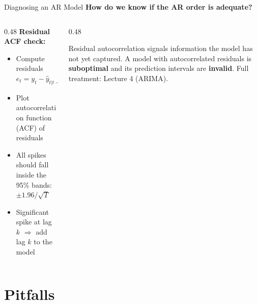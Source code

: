 \documentclass[aspectratio=169, 11pt]{beamer}
\begin{document}
\begin{frame}{Diagnosing an AR Model}
  \textbf{How do we know if the AR order is adequate?}

  \vspace{0.1cm}
  \begin{columns}[T]
    \begin{column}{0.48\textwidth}
      \textbf{Residual ACF check:}
      \begin{itemize}
        \item Compute residuals $e_t = y_t - \hat{y}_{t|t-1}$
        \item Plot autocorrelation function (ACF) of residuals
        \item All spikes should fall inside the
              95\% bands: $\pm 1.96/\sqrt{T}$
        \item Significant spike at lag $k$
              $\Rightarrow$ add lag $k$ to the model
      \end{itemize}
    \end{column}
    \begin{column}{0.48\textwidth}
      \begin{warningbox}
        \small
        Residual autocorrelation signals
        information the model has not yet captured.
        A model with autocorrelated residuals
        is \textbf{suboptimal} and its prediction
        intervals are \textbf{invalid}.
        Full treatment: Lecture 4 (ARIMA).
      \end{warningbox}
    \end{column}
  \end{columns}
  \vspace{0.15cm}
\end{frame}

\section{Pitfalls}

\end{document}
